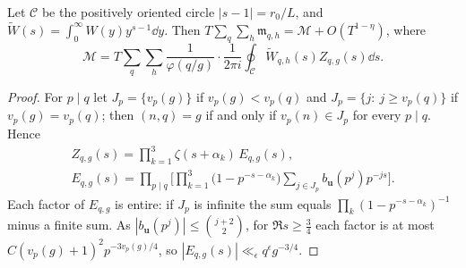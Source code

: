 \documentclass[11pt,colorlinks]{charlie}
\begin{document}
\begin{lemma}\label{lem:balpolar}
Let $\mathcal C$ be the positively oriented circle $|s-1|=r_0/L$, and $\widetilde W(s)=\int_0^\infty W(y)y^{s-1}\dd y$. Then $T\sum_q\sum_h\mathfrak m_{q,h}=\mathcal M+O(T^{1-\eta})$, where
\[
 \mathcal M=T\sum_q\sum_h\frac1{\varphi(q/g)}\cdot\frac1{2\pi i}\oint_{\mathcal C}\widetilde W_{q,h}(s)Z_{q,g}(s)\dd s .
\]
\end{lemma}
\begin{proof}
For $p\mid q$ let $J_p=\{v_p(g)\}$ if $v_p(g)<v_p(q)$ and $J_p=\{j:\ j\ge v_p(q)\}$ if $v_p(g)=v_p(q)$; then $(n,q)=g$ if and only if $v_p(n)\in J_p$ for every $p\mid q$. Hence
\begin{gather*}
 Z_{q,g}(s)=\prod_{k=1}^3\zeta(s+\alpha_k)\,E_{q,g}(s),\\
 E_{q,g}(s)=\prod_{p\mid q}\Big[\prod_{k=1}^3\big(1-p^{-s-\alpha_k}\big)\sum_{j\in J_p}b_{\boldsymbol u}(p^j)p^{-js}\Big].
\end{gather*}
Each factor of $E_{q,g}$ is entire: if $J_p$ is infinite the sum equals $\prod_k(1-p^{-s-\alpha_k})^{-1}$ minus a finite sum. As $|b_{\boldsymbol u}(p^j)|\le\binom{j+2}2$, for $\Re s\ge\frac34$ each factor is at most $C(v_p(g)+1)^2p^{-3v_p(g)/4}$, so $|E_{q,g}(s)|\ll_\epsilon q^\epsilon g^{-3/4}$.


\end{proof}
\end{document}
